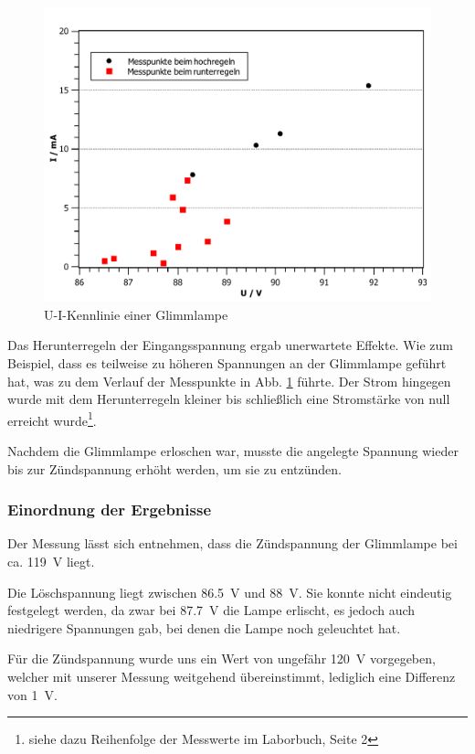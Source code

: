 \documentclass[11pt,a4paper,titlepage, ngerman]{article}
\begin{document}
				\begin{figure}[ht]
					\centering
					\includegraphics[width=\textwidth]{KennlinieGlimmlampe_2.pdf}
					\caption{U-I-Kennlinie einer Glimmlampe}
					\label{KL e}
				\end{figure}
				
				Das Herunterregeln der Eingangsspannung ergab unerwartete Effekte. Wie zum Beispiel, dass es teilweise zu höheren Spannungen an der Glimmlampe geführt hat, was zu dem Verlauf der Messpunkte in Abb. \ref{KL e} führte.				
				Der Strom hingegen wurde mit dem Herunterregeln kleiner bis schließlich eine Stromstärke von null erreicht wurde\footnote{siehe dazu Reihenfolge der Messwerte im Laborbuch, Seite 2}.

				Nachdem die Glimmlampe erloschen war, musste die angelegte Spannung wieder bis zur Zündspannung erhöht werden, um sie zu entzünden.
			
			\subsubsection*{Einordnung der Ergebnisse}
			
				Der Messung lässt sich entnehmen, dass die Zündspannung der Glimmlampe bei ca. \SI{119}{\volt} liegt.
				
				Die Löschspannung liegt zwischen \SI{86,5}{\volt} und \SI{88}{\volt}. Sie konnte nicht eindeutig festgelegt werden, da zwar bei \SI{87,7}{\volt} die Lampe erlischt, es jedoch auch niedrigere Spannungen gab, bei denen die Lampe noch geleuchtet hat.
				
				Für die Zündspannung wurde uns ein Wert von ungefähr \SI{120}{\volt} vorgegeben, welcher mit unserer Messung weitgehend übereinstimmt, lediglich eine Differenz von \SI{1}{\volt}.
					
\end{document}
